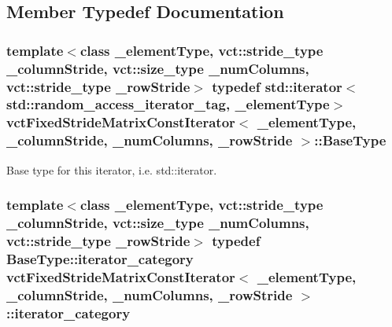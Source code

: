 \subsection{Member Typedef Documentation}
\hypertarget{classvct_fixed_stride_matrix_const_iterator_a305e6edbe5e4e2560f9bf01d3079a118}{
\subsubsection[{Base\-Type}]{\setlength{\rightskip}{0pt plus 5cm}template$<$class \-\_\-element\-Type, vct\-::stride\-\_\-type \-\_\-column\-Stride, vct\-::size\-\_\-type \-\_\-num\-Columns, vct\-::stride\-\_\-type \-\_\-row\-Stride$>$ typedef std\-::iterator$<$std\-::random\-\_\-access\-\_\-iterator\-\_\-tag, \-\_\-element\-Type$>$ {\bf vct\-Fixed\-Stride\-Matrix\-Const\-Iterator}$<$ \-\_\-element\-Type, \-\_\-column\-Stride, \-\_\-num\-Columns, \-\_\-row\-Stride $>$\-::{\bf Base\-Type}}}\label{classvct_fixed_stride_matrix_const_iterator_a305e6edbe5e4e2560f9bf01d3079a118}
Base type for this iterator, i.\-e. std\-::iterator. \hypertarget{classvct_fixed_stride_matrix_const_iterator_a31bfb3c59476ee6060ec1d08874c0419}{
\subsubsection[{iterator\-\_\-category}]{\setlength{\rightskip}{0pt plus 5cm}template$<$class \-\_\-element\-Type, vct\-::stride\-\_\-type \-\_\-column\-Stride, vct\-::size\-\_\-type \-\_\-num\-Columns, vct\-::stride\-\_\-type \-\_\-row\-Stride$>$ typedef Base\-Type\-::iterator\-\_\-category {\bf vct\-Fixed\-Stride\-Matrix\-Const\-Iterator}$<$ \-\_\-element\-Type, \-\_\-column\-Stride, \-\_\-num\-Columns, \-\_\-row\-Stride $>$\-::{\bf iterator\-\_\-category}}}\label{classvct_fixed_stride_matrix_const_iterator_a31bfb3c59476ee6060ec1d08874c0419}
